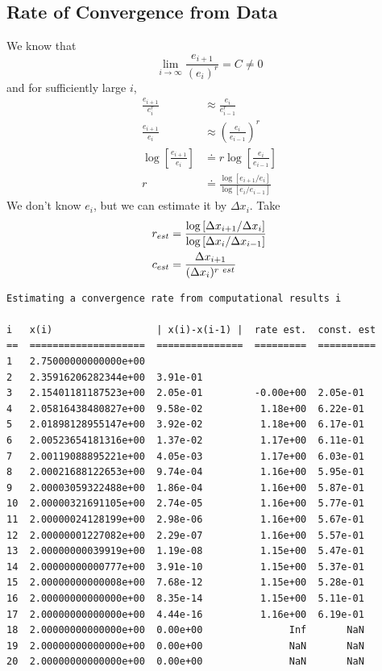 \subsection{Rate of Convergence from Data}

We know that \[
    \lim_{i \to \infty} \frac{e_{i+1}}{(e_i)^r} = C \neq 0
\] and for sufficiently large \( i \), \begin{align*}
    \frac{e_{i+1}}{e_i^r}
      & \approx \frac{e_i}{e_{i-1}^r}
    \\
    \frac{e_{i+1}}{e_i}
      & \approx \left( \frac{e_i}{e_{i-1}} \right)^r
    \\
    \log\left[ \frac{e_{i+1}}{e_i} \right]
      & \doteq r \log\left[ \frac{e_i}{e_{i-1}} \right]
    \\
    r & \doteq \frac{\log\left[ e_{i+1} / e_i \right]}{\log\left[ e_i / e_{i-1} \right]}
\end{align*} We don't know \( e_i \), but we can estimate it by \( \Delta x_i \). Take \begin{align*}
    r_{est}
     & = \frac{\log\left[ \Delta x_{i+1} / \Delta x_i \right]}{\log\left[ \Delta x_i / \Delta x_{i-1} \right]}
    \\
    c_{est}
     & = \frac{\Delta x_{i+1}}{(\Delta x_i)^{r~\footnotesize{est}}}
\end{align*}

\begin{verbatim}
Estimating a convergence rate from computational results i

i   x(i)                  | x(i)-x(i-1) |  rate est.  const. est
==  ====================  ===============  =========  ==========
1   2.75000000000000e+00   
2   2.35916206282344e+00  3.91e-01  
3   2.15401181187523e+00  2.05e-01         -0.00e+00  2.05e-01
4   2.05816438480827e+00  9.58e-02          1.18e+00  6.22e-01
5   2.01898128955147e+00  3.92e-02          1.18e+00  6.17e-01
6   2.00523654181316e+00  1.37e-02          1.17e+00  6.11e-01
7   2.00119088895221e+00  4.05e-03          1.17e+00  6.03e-01
8   2.00021688122653e+00  9.74e-04          1.16e+00  5.95e-01
9   2.00003059322488e+00  1.86e-04          1.16e+00  5.87e-01
10  2.00000321691105e+00  2.74e-05          1.16e+00  5.77e-01
11  2.00000024128199e+00  2.98e-06          1.16e+00  5.67e-01
12  2.00000001227082e+00  2.29e-07          1.16e+00  5.57e-01
13  2.00000000039919e+00  1.19e-08          1.15e+00  5.47e-01
14  2.00000000000777e+00  3.91e-10          1.15e+00  5.37e-01
15  2.00000000000008e+00  7.68e-12          1.15e+00  5.28e-01
16  2.00000000000000e+00  8.35e-14          1.15e+00  5.11e-01
17  2.00000000000000e+00  4.44e-16          1.16e+00  6.19e-01
18  2.00000000000000e+00  0.00e+00               Inf       NaN
19  2.00000000000000e+00  0.00e+00               NaN       NaN
20  2.00000000000000e+00  0.00e+00               NaN       NaN
\end{verbatim}

